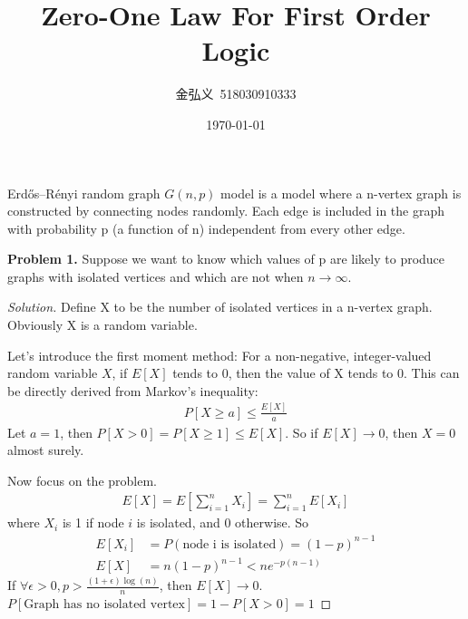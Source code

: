 \documentclass[a4paper, linespread=1.5]{article}
\begin{document}
    \title{ Zero-One Law For First Order Logic }
    \author{金弘义\ 518030910333}
    \date{\today}
    \maketitle

    \begin{customdef}{1}
        Erdős–Rényi random graph $G(n, p)$ model is a model where a n-vertex graph is constructed by connecting nodes randomly.
        Each edge is included in the graph with probability p (a function of n) independent from every other edge.
    \end{customdef}
    \textbf{Problem 1.} Suppose we want to know which values of p are likely to produce graphs with isolated vertices and which are not when $n\to \infty$.
    \begin{proof}[Solution]
        Define X to be the number of isolated vertices in a n-vertex graph.
        Obviously X is a random variable.

        Let's introduce the first moment method: For a non-negative, integer-valued random variable $X$, if $E[X]$ tends to 0, then the value of X tends to 0.
        This can be directly derived from Markov's inequality:
        \begin{align}
            P[X\ge a]\le \frac{E[X]}{a}
        \end{align}
        Let $a=1$, then $P[X>0]=P[X\ge 1]\le E[X]$.
        So if $E[X]\to 0$, then $X=0$ almost surely.

        Now focus on the problem.
        \begin{align}
            E[X]=E[\sum\limits_{i=1}^{n}X_i]=\sum\limits_{i=1}^{n}E[X_i]
        \end{align}
        where $X_i$ is 1 if node $i$ is isolated, and 0 otherwise.
        So
        \begin{align*}
            E[X_i]&=P(\text{node i is isolated})=(1-p)^{n-1}\\
            E[X]&=n(1-p)^{n-1}<ne^{-p(n-1)}
        \end{align*}
        If $\forall \epsilon>0, p>\frac{(1+\epsilon)\log (n)}{n}$, then $E[X]\to 0$.
        $P[\text{Graph has no isolated vertex}]=1-P[X>0]=1$


\end{proof}
\end{document}
